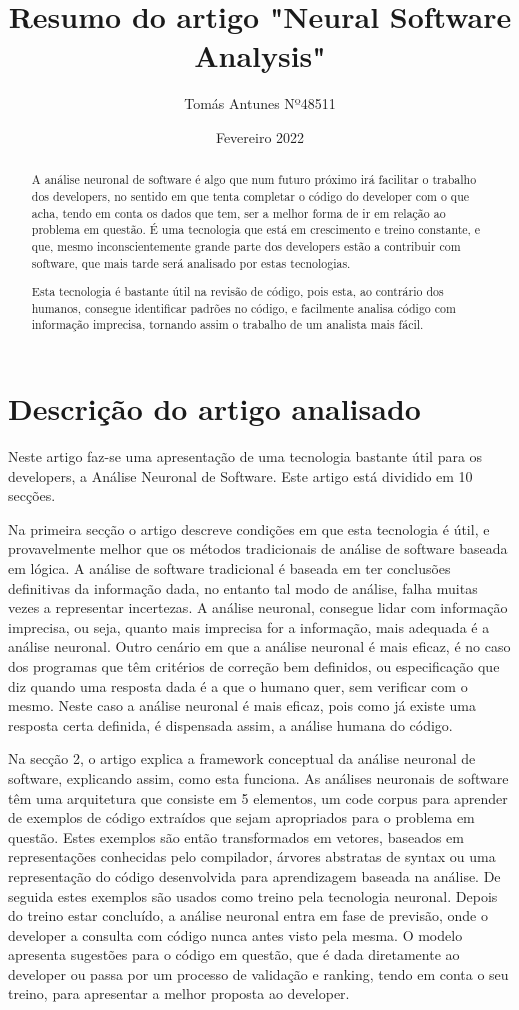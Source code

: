 \documentclass{article}
\title{Resumo do artigo "Neural Software Analysis"}
\author{Tomás Antunes Nº48511}
\date{Fevereiro 2022}
\begin{document}
\maketitle
\begin{abstract}
A análise neuronal de software é algo que num futuro próximo irá facilitar o trabalho dos developers, no sentido em que tenta completar o código do developer com o que acha, tendo em conta os dados que tem, ser a melhor forma de ir em relação ao problema em questão. É uma tecnologia que está em crescimento e treino constante, e que, mesmo inconscientemente grande parte dos developers estão a contribuir com software, que mais tarde será analisado por estas tecnologias.

Esta tecnologia é bastante útil na revisão de código, pois esta, ao contrário dos humanos, consegue identificar padrões no código, e facilmente analisa código com informação imprecisa, tornando assim o trabalho de um analista mais fácil.
\end{abstract}
\section{Descrição do artigo analisado}
Neste artigo faz-se uma apresentação de uma tecnologia bastante útil para os developers, a Análise Neuronal de Software. Este artigo está dividido em 10 secções.

Na primeira secção o artigo descreve condições em que esta tecnologia é útil, e provavelmente melhor que os métodos tradicionais de análise de software baseada em lógica. A análise de software tradicional é baseada em ter conclusões definitivas da informação dada, no entanto tal modo de análise, falha muitas vezes a representar incertezas. A análise neuronal, consegue lidar com informação imprecisa, ou seja, quanto mais imprecisa for a informação, mais adequada é a análise neuronal. Outro cenário em que a análise neuronal é mais eficaz, é no caso dos programas que têm critérios de correção bem definidos, ou especificação que diz quando uma resposta dada é a que o humano quer, sem verificar com o mesmo. Neste caso a análise neuronal é mais eficaz, pois como já existe uma resposta certa definida, é dispensada assim, a análise humana do código.

Na secção 2, o artigo explica a framework conceptual da análise neuronal de software, explicando assim, como esta funciona. As análises neuronais de software têm uma arquitetura que consiste em 5 elementos, um code corpus para aprender de exemplos de código extraídos que sejam apropriados para o problema em questão. Estes exemplos são então transformados em vetores, baseados em representações conhecidas pelo compilador, árvores abstratas de syntax ou uma representação do código desenvolvida para aprendizagem baseada na análise. De seguida estes exemplos são usados como treino pela tecnologia neuronal. Depois do treino estar concluído, a análise neuronal entra em fase de previsão, onde o developer a consulta com código nunca antes visto pela mesma. O modelo apresenta sugestões para o código em questão, que é dada diretamente ao developer ou passa por um processo de validação e ranking, tendo em conta o seu treino, para apresentar a melhor proposta ao developer.
\end{document}
